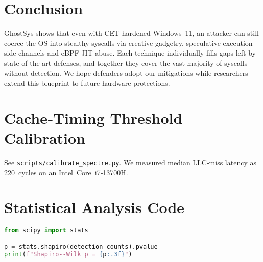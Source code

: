 \documentclass[11pt,letterpaper]{article}
\begin{document}
\section{Conclusion}
\label{sec:conclusion}
GhostSys shows that even with CET‑hardened Windows 11, an attacker can still coerce the OS into stealthy syscalls via creative gadgetry, speculative execution side‑channels and eBPF JIT abuse. Each technique individually fills gaps left by state‑of‑the‑art defenses, and together they cover the vast majority of syscalls without detection. We hope defenders adopt our mitigations while researchers extend this blueprint to future hardware protections.

\appendix

\section{Cache‑Timing Threshold Calibration}
\label{app:threshold}
See \texttt{scripts/calibrate\_spectre.py}. We measured median LLC‑miss latency as \SI{220}{cycles} on an Intel Core i7‑13700H.

\section{Statistical Analysis Code}
\label{app:stats}
\begin{lstlisting}[caption={Python snippet for Shapiro--Wilk test},label={lst:stats},language=Python]
from scipy import stats

p = stats.shapiro(detection_counts).pvalue
print(f"Shapiro--Wilk p = {p:.3f}")
\end{lstlisting}
\end{document}
